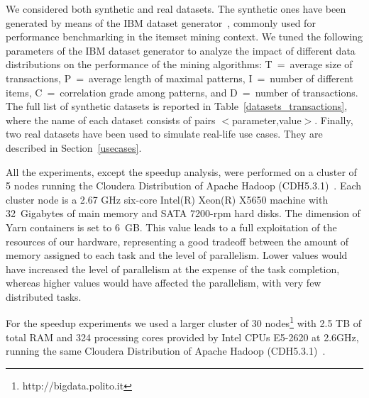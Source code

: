We considered both synthetic and real datasets.
The synthetic ones have been
generated by means of the IBM dataset generator~\cite{Quest}, commonly used for performance benchmarking in the
itemset mining context.
We tuned the following parameters of the IBM dataset generator to analyze
the impact of different data distributions on the performance of the
mining algorithms:
T~=~average size of transactions,
P~=~average length of maximal patterns,
I~=~number of different items,
C~=~correlation grade among patterns, and
D~=~number of transactions.
The full list of synthetic datasets is reported in Table~\ref{datasets_transactions},
where the name of each dataset consists of pairs $<$parameter,value$>$.
Finally, two real datasets have been used to simulate real-life use cases.
They are described in Section~\ref{usecases}.

All the experiments, except the speedup analysis, 
were performed on a cluster of 5 nodes running the Cloudera
Distribution of Apache Hadoop (CDH5.3.1)~\cite{cloudera}.
Each cluster node is a 2.67 GHz six-core Intel(R) Xeon(R) X5650 machine
with 32~Gigabytes of main memory and SATA 7200-rpm hard disks.
The dimension of Yarn containers is set to 6~GB. This value leads to a
full exploitation of the resources of our hardware, representing a good
tradeoff between the amount of memory assigned to each task and the
level of parallelism.
Lower values would have increased the level of parallelism at the expense
of the task completion, whereas higher values would have affected
the parallelism, with very few distributed tasks.

For the speedup experiments we used a larger cluster of 30 nodes\footnote{http://bigdata.polito.it} 
with 2.5 TB of total RAM and 324 processing cores provided by Intel CPUs E5-2620 at 2.6GHz, 
running the same Cloudera Distribution of Apache Hadoop (CDH5.3.1)~\cite{cloudera}. 

